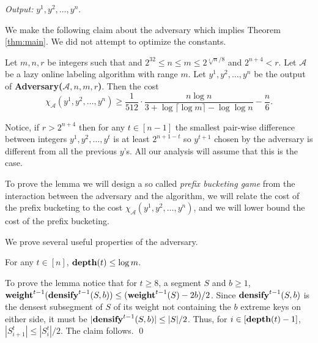 \documentclass[runningheads,a4paper]{llncs}
\newcommand{\A}{\mathcal{A}}
\newcommand{\weight}{{\rm {\bf weight}}}
\newcommand{\depth}{{\rm {\bf depth}}}
\newcommand{\densify}{{\rm {\bf densify}}}
\renewenvironment{proof}{\noindent{\it Proof. }} {{\qed}}
\begin{document}
\noindent\emph{Output:} $y^1,y^2,\dots,y^n$.

\medskip
We make the following claim about the adversary which implies Theorem \ref{thm:main}. We did not attempt to optimize
the constants.

\begin{lemma}\label{l-main}
Let $m,n,r$ be integers such that and $2^{32} \le n \le m \le 2^{\sqrt[4]{n}/8}$ and $2^{n+4}<r$. 
Let $\A$ be a lazy online labeling algorithm with range $m$. 
Let $y^1,y^2,\dots,y^n$ be the output of {\bf Adversary($\A,n,m,r$)}. 
Then the cost $$\chi_\A(y^1,y^2,\dots,y^n) \ge \frac{1}{512} \cdot \frac{n \log n}{ 3 + \log \lceil \log m \rceil - \log \log n} - \frac{n}{6}.$$
\end{lemma}

%

Notice, if $r>2^{n+4}$ then for any $t\in[n-1]$ the smallest pair-wise difference between integers $y^1,y^2,\dots,y^t$ is
at least $2^{n+1-t}$ so $y^{t+1}$ chosen by the adversary is different from all the previous $y$'s. All our analysis will assume
that this is the case.
 
To prove the lemma we will design a so called \emph{prefix bucketing game} from the interaction between the
adversary and the algorithm, we will relate the cost of the prefix bucketing to the cost $\chi_\A(y^1,y^2,\dots,y^n)$,
and we will lower bound the cost of the prefix bucketing.

We prove several useful properties of the adversary.
 
\begin{lemma}
For any $t\in [n]$, $\depth(t)\le \log m$.
\end{lemma}

\begin{proof}
To prove the lemma notice that for $t\ge 8$, a segment $S$ and 
$b\ge 1$, $\weight^{t-1}(\densify^{t-1}(S,b)) \le (\weight^{t-1}(S)-2b)/2$. Since $\densify^{t-1}(S,b)$
is the densest subsegment of $S$ of its weight not containing the $b$ extreme keys on 
either side, it must be $|\densify^{t-1}(S,b)| \le |S|/2$.
Thus, for $i\in[\depth(t)-1]$, $|S^t_{i+1}| \le |S^t_{i}|/2$. The claim follows.
\end{proof}
\end{document}
